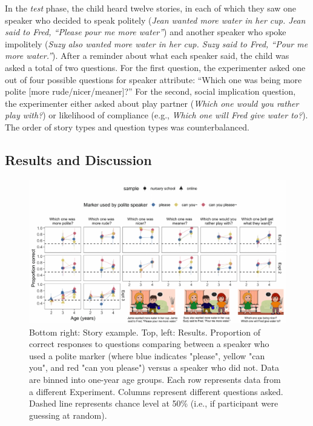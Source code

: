 \documentclass[10pt, letterpaper]{article}
\newenvironment{CodeChunk}{}{}
\begin{document}
In the \emph{test} phase, the child heard twelve stories, in each of
which they saw one speaker who decided to speak politely (\emph{Jean
wanted more water in her cup. Jean said to Fred, ``Please pour me more
water''}) and another speaker who spoke impolitely (\emph{Suzy also
wanted more water in her cup. Suzy said to Fred, ``Pour me more
water.''}). After a reminder about what each speaker said, the child was
asked a total of two questions. For the first question, the experimenter
asked one out of four possible questions for speaker attribute: ``Which
one was being more polite {[}more rude/nicer/meaner{]}?'' For the
second, social implication question, the experimenter either asked about
play partner (\emph{Which one would you rather play with?}) or
likelihood of compliance (e.g., \emph{Which one will Fred give water
to?}). The order of story types and question types was counterbalanced.

\subsection{Results and Discussion}\label{results-and-discussion}

\begin{CodeChunk}
\captionsetup{width=0.8\textwidth}\begin{figure}[h]

{\centering \includegraphics{figs/fig_results_placement-1} 

}

\caption[Bottom right]{Bottom right: Story example. Top, left: Results. Proportion of correct responses to questions comparing between a speaker who used a polite marker (where blue indicates "please", yellow "can you", and red "can you please") versus a speaker who did not. Data are binned into one-year age groups. Each row represents data from a different Experiment. Columns represent different questions asked. Dashed line represents chance level at 50\% (i.e., if participant were guessing at random).}\label{fig:fig_results_placement}
\end{figure}
\end{CodeChunk}
\end{document}

